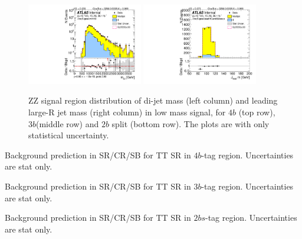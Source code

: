 \begin{figure}[htbp!]
\begin{center}
\includegraphics[width=0.45\textwidth,angle=-90]{figures/boosted/ZZ/Moriond_ZZ_TwoTag_split_Signal_mHH_l_1.pdf}
\includegraphics[width=0.45\textwidth,angle=-90]{figures/boosted/ZZ/Moriond_ZZ_TwoTag_split_Signal_leadHCand_Mass_s.pdf}\\
\end{center}
\caption{ZZ signal region distribution of di-jet mass (left column) and leading large-R jet mass (right column) in low mass signal, for $4b$ (top row), $3b$(middle row) and $2b$ split (bottom row). The plots are with only statistical uncertainty.}
\label{CRSB:ZZSR_Distribution}
\end{figure}

\begin{table}[htbp!]
\begin{center}

\end{center}
\caption{Background prediction in SR/CR/SB for TT SR in $4b$-tag region. Uncertainties are stat only.}
\label{CRSB:SummaryTable_TT_4b}
\end{table}

\begin{table}[htbp!]
\begin{center}

\end{center}
\caption{Background prediction in SR/CR/SB for TT SR in $3b$-tag region. Uncertainties are stat only.}
\label{CRSB:SummaryTable_TT_3b}
\end{table}

\begin{table}[htbp!]
\begin{center}

\end{center}
\caption{Background prediction in SR/CR/SB for TT SR in $2bs$-tag region. Uncertainties are stat only.}
\label{CRSB:SummaryTable_TT_2b}
\end{table}

